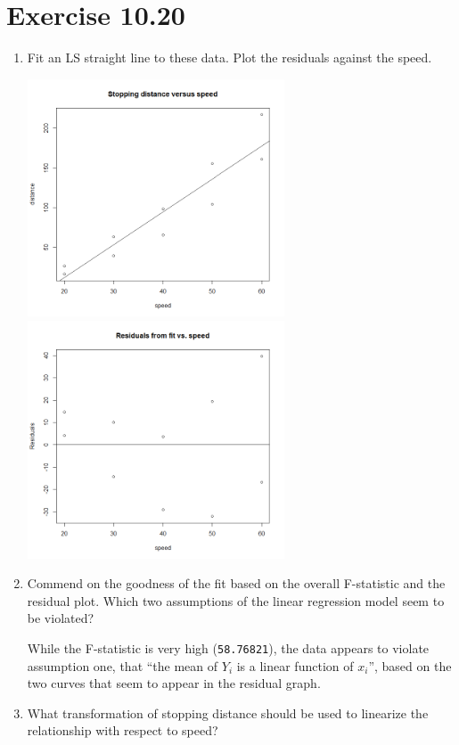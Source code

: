 \documentclass{article}
\begin{document}
\section*{Exercise 10.20}

\begin{enumerate}[\quad(a)]
	\item Fit an LS straight line to these data. Plot the residuals against the speed.\\
	\begin{center}
		\includegraphics[width=3in]{Q51.png}$\qquad$\includegraphics[width=3in]{Q52.png}
	\end{center}
	\item Commend on the goodness of the fit based on the overall F-statistic and the residual plot. Which two assumptions of the linear regression model seem to be violated?

	While the F-statistic is very high (\texttt{58.76821}), the data appears to violate assumption one, that ``the mean of $Y_i$ is a linear function of $x_i$'', based on the two curves that seem to appear in the residual graph.
	\item What transformation of stopping distance should be used to linearize the relationship with respect to speed?


\end{enumerate}
\end{document}
